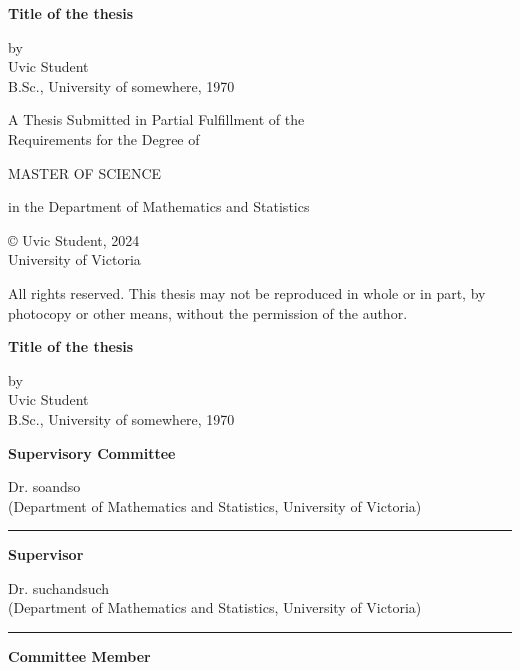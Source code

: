 \documentclass[12pt]{report}
\begin{document}
\setcounter{page}{1} %


\newpage
{\singlespacing

\begin{center}
{\Large \textbf {Title of the thesis}}
\vspace{2em}

by\\
Uvic Student\\
B.Sc., University of somewhere, 1970

\vspace{2em}

A Thesis Submitted in Partial Fulfillment of the\\
Requirements for the Degree of

\vspace{1em}
MASTER OF SCIENCE
\vspace{1em}

in the Department of Mathematics and Statistics

\vfill

\copyright\; Uvic Student, 2024\\
University of Victoria

\vspace{1em}
All rights reserved. This thesis may not be reproduced in whole or in part, by photocopy or other means, without the permission of the author.
\end{center}
}

\newpage



{\singlespacing
\begin{center}
{\Large \textbf {Title of the thesis}}
\vspace{2em}




by\\
Uvic Student\\
B.Sc., University of somewhere, 1970
\end{center}

\vfill
\begin{spacing}{0.4}

\noindent \textbf{Supervisory Committee}
\vspace{2em}

\noindent Dr. soandso\\
(Department of Mathematics and Statistics, University of Victoria)
\par\noindent\rule{\textwidth}{0.8pt}
{\small \textbf{Supervisor}}
\vspace{1em}

\noindent Dr. suchandsuch\\
(Department of Mathematics and Statistics, University of Victoria)
\par\noindent\rule{\textwidth}{0.8pt}
{\small \textbf{Committee Member}}
\vspace{1em}

\end{spacing}
\vfill
}
\end{document}
